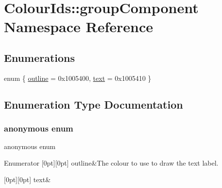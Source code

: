 \hypertarget{namespaceColourIds_1_1groupComponent}{}\section{Colour\+Ids\+:\+:group\+Component Namespace Reference}
\label{namespaceColourIds_1_1groupComponent}
\subsection*{Enumerations}
\begin{DoxyCompactItemize}
\item 
enum \{ \mbox{\hyperlink{namespaceColourIds_1_1groupComponent_a0d6c2f8eedf1fe1fec5dc460686fda44a65b62f8e79cc9c9adff94d3bd836e0f7}{outline}} = 0x1005400, 
\mbox{\hyperlink{namespaceColourIds_1_1groupComponent_a0d6c2f8eedf1fe1fec5dc460686fda44a20367c360cb321f2feb7781f267dfb1d}{text}} = 0x1005410
 \}
\end{DoxyCompactItemize}


\subsection{Enumeration Type Documentation}
\mbox{\label{namespaceColourIds_1_1groupComponent_a0d6c2f8eedf1fe1fec5dc460686fda44}} 
\subsubsection{\texorpdfstring{anonymous enum}{anonymous enum}}
{\footnotesize\ttfamily anonymous enum}

\begin{DoxyEnumFields}{Enumerator}
[0pt][0pt]{}\mbox{\label{namespaceColourIds_1_1groupComponent_a0d6c2f8eedf1fe1fec5dc460686fda44a65b62f8e79cc9c9adff94d3bd836e0f7}} 
outline&The colour to use to draw the text label. \\
\hline

[0pt][0pt]{}\mbox{\label{namespaceColourIds_1_1groupComponent_a0d6c2f8eedf1fe1fec5dc460686fda44a20367c360cb321f2feb7781f267dfb1d}} 
text&\\
\hline

\end{DoxyEnumFields}
